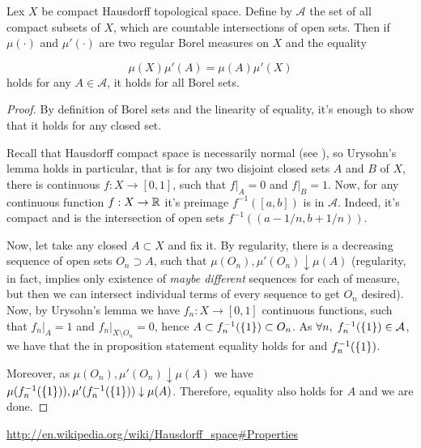 \documentclass[8pt]{article} %
\begin{document}
\begin{myprop}Lex $X$ be compact Hausdorff topological space. Define by $\mathcal{A}$ the set of all compact subsets of $X$,
which are countable intersections of open sets. Then if $\mu(\cdot)$ and $\mu'(\cdot)$ are two regular Borel measures
on $X$ and the equality  \end{myprop}
\begin{equation}\mu(X)\mu'(A)=\mu(A)\mu'(X)\end{equation}
holds for any $A\in\mathcal{A}$, it holds for all Borel sets.
\begin{proof}
By definition of Borel sets and the linearity of equality, it's enough to show that it holds for any closed set.

Recall that Hausdorff compact space is necessarily normal (see \cite{normal}), so Urysohn's lemma holds in particular, that is
for any two disjoint closed sets $A$ and $B$ of $X$, there is continuous $f:X\to[0,1]$, such that $f\big|_A=0$ and
$f\big|_B=1$. Now, for any continuous function $f:X\to\mathbb{R}$ it's preimage $f^{-1}([a,b])$ is in $\mathcal{A}$. Indeed, it's
compact and is the intersection of open sets $f^{-1}((a-1/n,b+1/n))$.

Now, let take any closed $A\subset X$ and fix it. By regularity, there is a decreasing sequence of open sets $O_n\supset A$, such that
$\mu(O_n),\mu'(O_n)\downarrow\mu(A)$ (regularity, in fact, implies only existence of \textit{maybe different} sequences
for each of measure, but then we can intersect individual terms of every sequence to get $O_n$ desired). Now, by Urysohn's lemma
we have $f_n:X\to[0,1]$ continuous functions, such that $f_n\big|_A=1$ and $f_n\big|_{X\setminus O_n}=0$, hence
$A\subset f_n^{-1}(\left\{1\right\})\subset O_n$. As $\forall n,\;f_n^{-1}(\left\{1\right\})\in\mathcal{A}$, we have
that the in proposition statement equality holds for and $f_n^{-1}(\left\{1\right\})$.

Moreover,
as $\mu(O_n),\mu'(O_n)\downarrow\mu(A)$ we have $\mu(f_n^{-1}(\left\{1\right\})),\mu'(f_n^{-1}(\left\{1\right\}))\downarrow\mu(A)$.
Therefore, equality also holds for $A$ and we are done.
\end{proof}
\begin{thebibliography}{9}
\url{http://en.wikipedia.org/wiki/Hausdorff_space#Properties}
\end{thebibliography}
\end{document}
